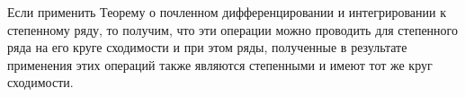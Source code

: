 \begin{remark}
    Если применить Теорему о почленном дифференцировании и интегрировании к
    степенному ряду, то получим, что эти операции можно проводить для
    степенного ряда на его круге сходимости и при этом ряды, полученные в
    результате применения этих операций также являются степенными и имеют
    тот же круг сходимости.
\end{remark}